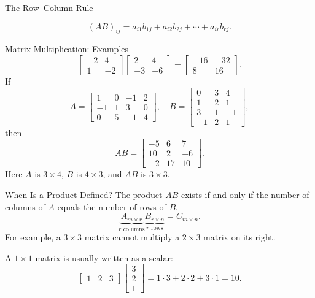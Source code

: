 \begin{frame}{The Row--Column Rule}
\centering
{}
\vfill
\[
(AB)_{ij}=a_{i1}b_{1j}+a_{i2}b_{2j}+\cdots+a_{ir}b_{rj}.
\]
\end{frame}

\begin{frame}[shrink=8]{Matrix Multiplication: Examples}
\[
\begin{bmatrix}-2&4\\1&-2\end{bmatrix}
\begin{bmatrix}2&4\\-3&-6\end{bmatrix}
=\begin{bmatrix}-16&-32\\8&16\end{bmatrix}.
\]
\medskip
If
\[
A=\begin{bmatrix}1&0&-1&2\\-1&1&3&0\\0&5&-1&4\end{bmatrix},\quad
B=\begin{bmatrix}0&3&4\\1&2&1\\3&1&-1\\-1&2&1\end{bmatrix},
\]
then
\[
AB=\begin{bmatrix}-5&6&7\\10&2&-6\\-2&17&10\end{bmatrix}.
\]
Here $A$ is $3\times4$, $B$ is $4\times3$, and $AB$ is $3\times3$.
\end{frame}

\begin{frame}{When Is a Product Defined?}
The product $AB$ exists if and only if the number of columns of $A$ equals the number of rows of $B$.
\[
\underbrace{A_{m\times r}}_{\text{$r$ columns}}
\underbrace{B_{r\times n}}_{\text{$r$ rows}}
=C_{m\times n}.
\]
For example, a $3\times3$ matrix cannot multiply a $2\times3$ matrix on its right.
\medskip

A $1\times1$ matrix is usually written as a scalar:
\[
\begin{bmatrix}1&2&3\end{bmatrix}
\begin{bmatrix}3\\2\\1\end{bmatrix}
=1\cdot3+2\cdot2+3\cdot1=10.
\]
\end{frame}




